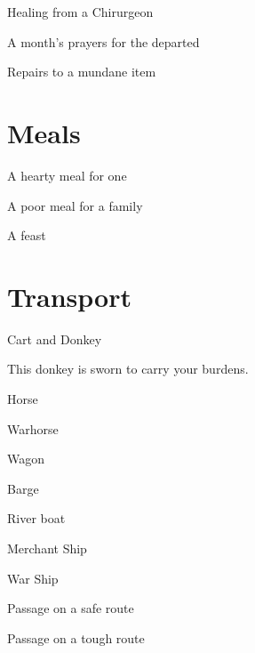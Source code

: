  

Healing from a Chirurgeon	 

 

A month's prayers for the departed	 

 

Repairs to a mundane item	 

 
\section{Meals}   
 

A hearty meal for one	 

 

A poor meal for a family	 

 

A feast	 

 
\section{Transport}   
 

Cart and Donkey	 

 

This donkey is sworn to carry your burdens.

 

Horse	 

 

Warhorse	 

 

Wagon	 

 

Barge	 

 

River boat	 

 

Merchant Ship	 

 

War Ship	 

 

Passage on a safe route	 

 

Passage on a tough route	 

 


